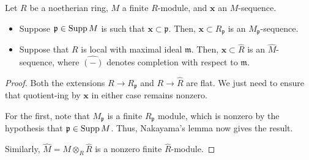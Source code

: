 \documentclass[12pt]{article}
\begin{document}
\begin{cor} \label{cor:regularity-localisation-completion}
	Let $R$ be a noetherian ring, $M$ a finite $R$-module, and $\mathbf{x}$ an $M$-sequence.
	\begin{itemize}
		\item Suppose $\mathfrak{p} \in \operatorname{Supp} M$ is such that $\mathbf{x} \subset \mathfrak{p}$. Then, $\mathbf{x} \subset R_{\mathfrak{p}}$ is an $M_{\mathfrak{p}}$-sequence.
		\item Suppose that $R$ is local with maximal ideal $\mathfrak{m}$. Then, $\mathbf{x} \subset \widehat{R}$ is an $\widehat{M}$-sequence, where $\widehat{(-)}$ denotes completion with respect to $\mathfrak{m}$.
	\end{itemize}
\end{cor}
\begin{proof} 
	Both the extensions $R \to R_{\mathfrak{p}}$ and $R \to \widehat{R}$ are flat. We just need to ensure that quotient-ing by $\mathbf{x}$ in either case remains nonzero. 

	For the first, note that $M_{\mathfrak{p}}$ is a finite $R_{\mathfrak{p}}$ module, which is nonzero by the hypothesis that $\mathfrak{p} \in \operatorname{Supp} M$. Thus, Nakayama's lemma now gives the result.

	Similarly, $\widehat{M} = M \otimes_{R} \widehat{R}$ is a nonzero finite $\widehat{R}$-module.
\end{proof}
\end{document}
